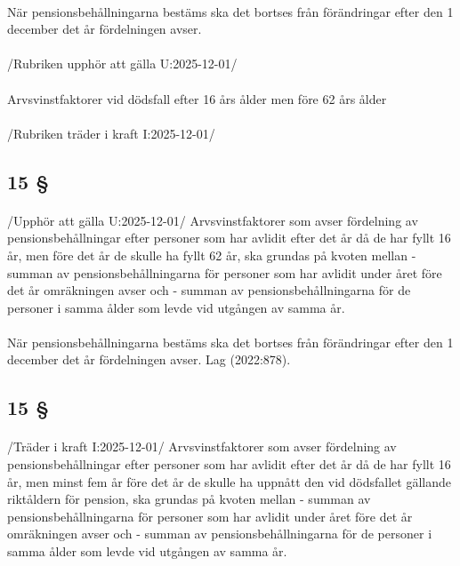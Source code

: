 \documentclass[a4paper,notitlepage,openany,10pt]{book}
\begin{document}
\paragraph*{}
När pensionsbehållningarna bestäms ska det bortses från förändringar efter den 1 december det år fördelningen avser.
\paragraph*{}
/Rubriken upphör att gälla U:2025-12-01/
\paragraph*{}
Arvsvinstfaktorer vid dödsfall efter 16 års ålder men före 62 års ålder
\paragraph*{}
/Rubriken träder i kraft I:2025-12-01/
\subsection*{15 §}
\paragraph*{}
/Upphör att gälla U:2025-12-01/
Arvsvinstfaktorer som avser fördelning av pensionsbehållningar efter personer som har avlidit efter det år då de har fyllt 16 år, men före det år de skulle ha fyllt 62 år, ska grundas på kvoten mellan
\newline - summan av pensionsbehållningarna för personer som har avlidit under året före det år omräkningen avser och
\newline - summan av pensionsbehållningarna för de personer i samma ålder som levde vid utgången av samma år.
\paragraph*{}
När pensionsbehållningarna bestäms ska det bortses från förändringar efter den 1 december det år fördelningen avser.
Lag (2022:878).
\subsection*{15 §}
\paragraph*{}
/Träder i kraft I:2025-12-01/
Arvsvinstfaktorer som avser fördelning av pensionsbehållningar efter personer som har avlidit efter det år då de har fyllt 16 år, men minst fem år före det år de skulle ha uppnått den vid dödsfallet gällande riktåldern för pension, ska grundas på kvoten mellan
\newline - summan av pensionsbehållningarna för personer som har avlidit under året före det år omräkningen avser och
\newline - summan av pensionsbehållningarna för de personer i samma ålder som levde vid utgången av samma år.
\end{document}
